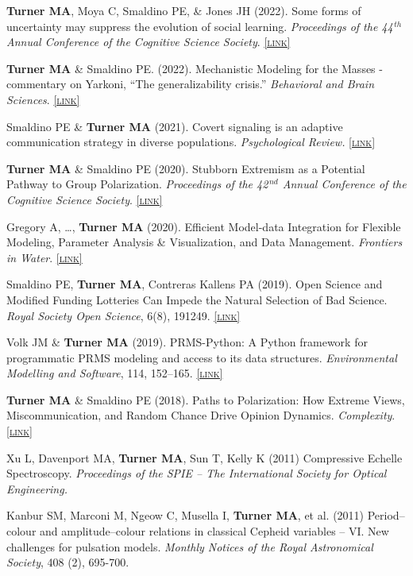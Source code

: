 \documentclass[11pt, letterpaper]{article}
\newcommand{\lurl}[1]{\href{#1}{\scriptsize\textsc{[link]}}}
\begin{document}
  \textbf{Turner MA}, Moya C, Smaldino PE, \& Jones JH (2022). Some
  forms of uncertainty may suppress the evolution of social
  learning. \emph{Proceedings of the 44$^{\,th}$ Annual Conference
  of the Cognitive Science Society}.
  \lurl{https://psyarxiv.com/dzteh/}

  \textbf{Turner MA} \& Smaldino PE. (2022). Mechanistic Modeling for the Masses - 
  commentary on Yarkoni, ``The generalizability crisis.''
  \emph{Behavioral and Brain Sciences}.
  \lurl{https://doi.org/10.1017/S0140525X2100039X}

  Smaldino PE \& \textbf{Turner MA} (2021). Covert signaling is an adaptive communication strategy in diverse populations. \emph{Psychological Review.} \lurl{https://doi.org/10.1037/rev0000344}

  \textbf{Turner MA} \& Smaldino PE (2020). Stubborn Extremism as a Potential Pathway to Group Polarization. \emph{Proceedings of the 42$^{\,nd}$ Annual Conference of the Cognitive Science Society}. \lurl{https://cogsci.mindmodeling.org/2020/papers/0153/}

    Gregory A, \ldots, \textbf{Turner MA} (2020). Efficient Model-data Integration for Flexible Modeling, Parameter Analysis \& Visualization, and Data Management. \emph{Frontiers in Water}. 
    \lurl{https://doi.org/10.3389/frwa.2020.00002}

    Smaldino PE, \textbf{Turner MA}, Contreras Kallens PA (2019). Open Science and Modified Funding Lotteries Can Impede the Natural Selection of Bad Science. \emph{Royal Society Open Science}, 6(8), 191249. \lurl{https://doi.org/10.1098/rsos.191249}

    Volk JM \& \textbf{Turner MA} (2019). PRMS-Python: A Python framework for programmatic PRMS modeling and access to its data structures. \emph{Environmental Modelling and Software}, 114, 152–165. \lurl{https://doi.org/10.1016/j.envsoft.2019.01.006}

    \textbf{Turner MA} \& Smaldino PE (2018). Paths to Polarization: How Extreme Views,
    Miscommunication, and Random Chance Drive Opinion Dynamics. \emph{Complexity}. \lurl{https://doi.org/10.1155/2018/2740959}
    

    Xu L, Davenport MA, \textbf{Turner MA}, Sun T, Kelly K (2011) Compressive Echelle Spectroscopy. \emph{Proceedings of the SPIE – The International Society for Optical Engineering.}

    Kanbur SM, Marconi M, Ngeow C, Musella I, \textbf{Turner MA}, et al. (2011) Period–colour and amplitude–colour relations in classical Cepheid variables – VI. New challenges for pulsation models. \emph{Monthly Notices of the Royal Astronomical Society}, 408 (2), 695-700.
\end{document}
